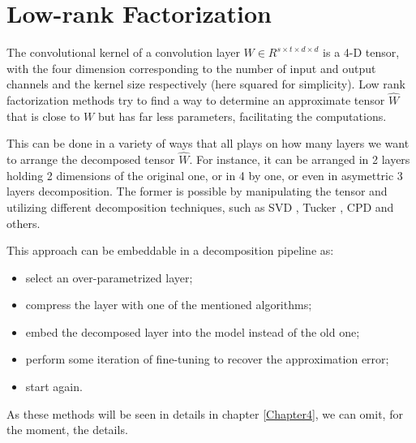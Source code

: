 \section{Low-rank Factorization}
The convolutional kernel of a convolution layer $W \in R^{s \times t \times d \times d}$ is a 4-D tensor, with the four dimension corresponding to the number of input and output channels and the kernel size respectively (here squared for simplicity). Low rank factorization methods try to find a way to determine an approximate tensor $\hat{W}$ that is close to $W$ but has far less parameters, facilitating the computations. 
\newline 

This can be done in a variety of ways that all plays on how many layers we want to arrange the decomposed tensor $\hat{W}$. For instance, it can be arranged in 2 layers holding 2 dimensions of the original one, or in 4 by one, or even in asymettric 3 layers decomposition. The former is possible by manipulating the tensor and utilizing different decomposition techniques, such as SVD \citep{zhang2015SVD}, Tucker \citep{Tucker-mobile}, CPD \citep{lebedev} and others.
\newline

This approach can be embeddable in a decomposition pipeline as: 
\begin{itemize}
  \item select an over-parametrized layer; 
  
  \item compress the layer with one of the mentioned algorithms; 
  
  \item embed the decomposed layer into the model instead of the old one; 
  
  \item perform some iteration of fine-tuning to recover the approximation error; 
  
  \item start again. 
\end{itemize}

As these methods will be seen in details in chapter \ref{Chapter4}, we can omit, for the moment, the details. 


